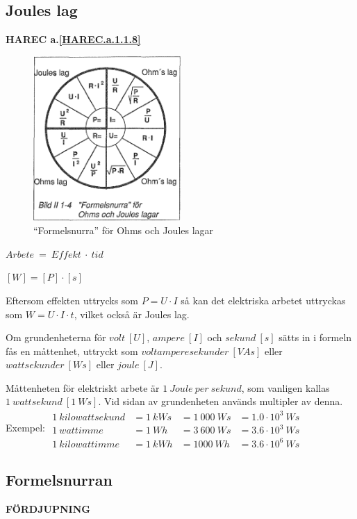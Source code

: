 \subsection{Joules lag}
\textbf{HAREC a.\ref{HAREC.a.1.1.8}\label{myHAREC.a.1.1.8}}

\begin{figure}
  \includegraphics[width=0.5\textwidth]{images/bild_2_1-04}
  \caption{``Formelsnurra'' för Ohms och Joules lagar}
  \label{fig:BildII1-4}
\end{figure}

\(Arbete\ =\ Effekt\ \cdot\ tid\)

\([W] = [P] \cdot [s]\)

Eftersom effekten uttrycks som \(P = U \cdot I\) så kan det elektriska arbetet
uttryckas som \(W = U \cdot I \cdot t\), vilket också är Joules lag.

Om grundenheterna för \(volt\ [U]\), \(ampere\ [I]\) och \(sekund\ [s]\) sätts in i
formeln fås en måttenhet, uttryckt som \(voltamperesekunder\ [VAs]\) eller
\(wattsekunder\ [Ws]\) eller \(joule\ [J]\).

Måttenheten för elektriskt arbete är \(1\ Joule\ per\ sekund\), som vanligen kallas
\(1\ wattsekund\ [1\ Ws]\).
Vid sidan av grundenheten används multipler
av denna.
Exempel:
\(
\begin{array}{llll}
1\ kilowattsekund & = 1\ kWs & = 1\ 000\ Ws & = 1.0 \cdot 10^3\ Ws\\
1\ wattimme & = 1\ Wh & = 3\ 600\ Ws & = 3.6 \cdot 10^3\ Ws \\
1\ kilowattimme & = 1\ kWh & = 1 000\ Wh & = 3.6 \cdot 10^6\ Ws
\end{array}
\)

\subsection{Formelsnurran}
\textbf{FÖRDJUPNING}

